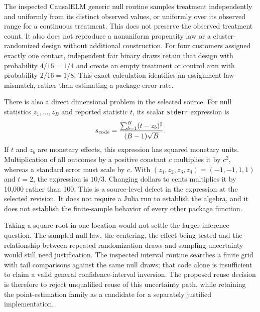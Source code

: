 The inspected CausalELM generic null routine samples treatment independently
and uniformly from its distinct observed values, or uniformly over its
observed range for a continuous treatment. This does not preserve the
observed treatment count. It also does not reproduce a nonuniform propensity
law or a cluster-randomized design without additional construction. For four
customers assigned exactly one contact, independent fair binary draws retain
that design with probability $4/16=1/4$ and create an empty treatment or
control arm with probability $2/16=1/8$. This exact calculation identifies an
assignment-law mismatch, rather than estimating a package error rate.
\citep{exec21_effects_causalelm,exec21_effects_reference}

There is also a direct dimensional problem in the selected source. For null
statistics $z_1,\ldots,z_B$ and reported statistic $t$, its scalar
\texttt{stderr} expression is
\begin{equation}
\label{exec21:effects-scale}
 s_{\rm code}=\frac{\sum_{b=1}^{B}(t-z_b)^2}{(B-1)\sqrt B}.
\end{equation}
If $t$ and $z_b$ are monetary effects, this expression has squared monetary
units. Multiplication of all outcomes by a positive constant $c$ multiplies
it by $c^2$, whereas a standard error must scale by $c$. With
$(z_1,z_2,z_3,z_4)=(-1,-1,1,1)$ and $t=2$, the expression is $10/3$.
Changing dollars to cents multiplies it by 10,000 rather than 100. This is a
source-level defect in the expression at the selected revision. It does not
require a Julia run to establish the algebra, and it does not establish the
finite-sample behavior of every other package function.
\citep{exec21_effects_causalelm,exec21_effects_reference}

Taking a square root in one location would not settle the larger inference
question. The sampled null law, the centering, the effect being tested and
the relationship between repeated randomization draws and sampling
uncertainty would still need justification. The inspected interval routine
searches a finite grid with tail comparisons against the same null draws;
that code alone is insufficient to claim a valid general confidence-interval
inversion. The proposed reuse decision is therefore to reject unqualified
reuse of this uncertainty path, while retaining the point-estimation family
as a candidate for a separately justified implementation.
\citep{exec21_effects_causalelm}

